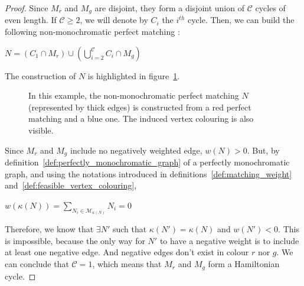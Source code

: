 \begin{proof}
    Since $M_r$ and $M_g$ are disjoint, they form a disjoint union of $\mathcal{C}$ cycles of even length.
    If $\mathcal{C} \geq 2$, we will denote by $C_i$ the $i^{th}$ cycle.
    Then, we can build the following non-monochromatic perfect matching :
    \begin{center}
        $N = (C_1 \cap M_r) \cup \left(\bigcup\limits_{i=2}^{\mathcal{C}} C_i \cap M_g\right)$
    \end{center}

    The construction of $N$ is highlighted in figure~\ref{fig:demo_unique_neg_ham}.

    \begin{figure}[H]   %
        \caption{In this example, the non-monochromatic perfect matching $N$ (represented by thick edges) is constructed from a red perfect matching and a blue one. The induced vertex colouring is also visible.}
        \label{fig:demo_unique_neg_ham}
    \end{figure}

    Since $M_r$ and $M_g$ include no negatively weighted edge, $w(N) > 0$.
    But, by definition~\ref{def:perfectly_monochromatic_graph} of a perfectly monochromatic graph, and using the notations introduced in definitions~\ref{def:matching_weight} and~\ref{def:feasible_vertex_colouring},

    \begin{center}
        $w(\kappa(N)) = \sum\limits_{N_i \in \mathcal{M}_{\kappa(N)}} N_i = 0$
    \end{center}

    Therefore, we know that $\exists N'$ such that $\kappa(N') = \kappa(N)$ and $w(N') < 0$.
    This is impossible, because the only way for $N'$ to have a negative weight is to include at least one negative edge.
    And negative edges don't exist in colour $r$ nor $g$.
    We can conclude that $\mathcal{C} = 1$, which means that $M_r$ and $M_g$ form a Hamiltonian cycle.
\end{proof}

